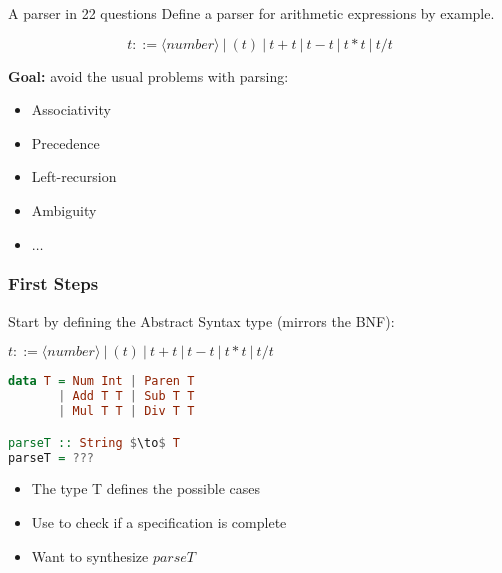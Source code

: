 \newcommand{\lsthaskell}[1]{\lstinline[language=haskell]{#1}}
\newcommand{\Q}{{\color{red}Q:}\hspace{2mm}}
\newcommand{\A}{{\color{blue}A:}\hspace{2mm}}

\begin{frame}{A parser in 22 questions}
  Define a parser for arithmetic expressions by example.

\[
  t ::= \langle number \rangle ~|~ ( t ) ~|~ t + t ~|~ t - t ~|~ t * t ~|~ t / t
\]

{\bf Goal:} avoid the usual problems with parsing:\\
\begin{itemize}
  \item{Associativity}
  \item Precedence
  \item Left-recursion
  \item Ambiguity
  \item $\dots$
\end{itemize}
\end{frame}

\begin{frame}[fragile]
\frametitle{First Steps}

  Start by defining the Abstract Syntax type (mirrors the BNF):

\begin{center}
\begin{minipage}{.7\textwidth}
$t ::= \langle number \rangle ~|~ ( t ) ~|~ t + t ~|~ t - t ~|~ t * t ~|~ t / t$

\begin{lstlisting}[mathescape,language=haskell]
data T = Num Int | Paren T
       | Add T T | Sub T T
       | Mul T T | Div T T

parseT :: String $\to$ T
parseT = ???
\end{lstlisting}
\end{minipage}
\end{center}

\begin{itemize}
\item{The type T defines the possible cases}
\item{Use to check if a specification is complete}
\item{Want to synthesize $parseT$}
\end{itemize}
\end{frame}


